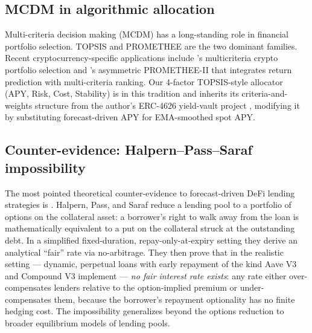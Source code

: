 \subsection{MCDM in algorithmic allocation}
\label{sec:bg-mcdm}

Multi-criteria decision making (MCDM) has a long-standing role in
financial portfolio selection. TOPSIS \cite{hwang1981mcdm} and PROMETHEE
\cite{brans1985promethee} are the two dominant families. Recent
cryptocurrency-specific applications include
\cite{aljinovic2021crypto}'s multicriteria crypto portfolio selection
and \cite{hosseinzadeh2023promethee}'s asymmetric PROMETHEE-II that
integrates return prediction with multi-criteria ranking. Our 4-factor
TOPSIS-style allocator (APY, Risk, Cost, Stability) is in this tradition
and inherits its criteria-and-weights structure from the author's
ERC-4626 yield-vault project \cite{solovev2026vault}, modifying it by
substituting forecast-driven APY for EMA-smoothed spot APY.

\subsection{Counter-evidence: Halpern--Pass--Saraf impossibility}
\label{sec:bg-impossibility}

The most pointed theoretical counter-evidence to forecast-driven DeFi
lending strategies is \cite{halpern2024fair}.  Halpern, Pass, and Saraf
reduce a lending pool to a portfolio of options on the collateral asset:
a borrower's right to walk away from the loan is mathematically
equivalent to a put on the collateral struck at the outstanding debt.
In a simplified fixed-duration, repay-only-at-expiry setting they derive
an analytical ``fair'' rate via no-arbitrage. They then prove that in
the realistic setting --- dynamic, perpetual loans with early repayment
of the kind Aave V3 and Compound V3 implement --- \emph{no fair
interest rate exists}: any rate either over-compensates lenders relative
to the option-implied premium or under-compensates them, because the
borrower's repayment optionality has no finite hedging cost.  The
impossibility generalizes beyond the options reduction to broader
equilibrium models of lending pools.

